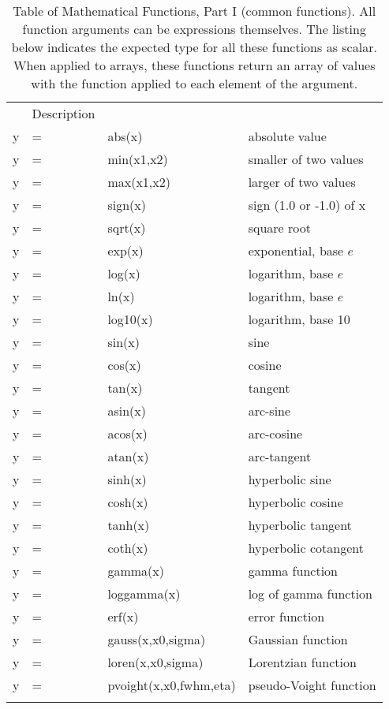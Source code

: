 \begin{table}[t]
{}
 \begin{center}
  \caption[a]{Table of Mathematical Functions, Part I (common functions).
    All function arguments can be expressions themselves.  The listing
    below indicates the expected type for all these functions as scalar.
    When applied to arrays, these functions return an array of values with
    the function applied to each element of the argument.  \smallskip }
  {\label{Table:Operators1}}
  \begin{tabular}{llll}
    \noalign{\smallskip}%
    \multicolumn{3}{l}{Function Prototype} & Description  \\ 
 \noalign{\smallskip}    \hline    \noalign{\smallskip}    
    y   &=&  abs(x)       & absolute value\\
    y   &=&  min(x1,x2)   & smaller of two values\\
    y   &=&  max(x1,x2)   & larger of two values\\
    y   &=&  sign(x)      & sign (1.0 or -1.0) of x \\
    y   &=&  sqrt(x)      & square root\\
    y   &=&  exp(x)       & exponential, base $e$\\
    y   &=&  log(x)       & logarithm, base $e$\\
    y   &=&  ln(x)        & logarithm, base $e$\\
    y   &=&  log10(x)     & logarithm, base 10\\
    y   &=&  sin(x)       & sine\\
    y   &=&  cos(x)       & cosine\\
    y   &=&  tan(x)       & tangent\\
    y   &=&  asin(x)      & arc-sine\\
    y   &=&  acos(x)      & arc-cosine\\
    y   &=&  atan(x)      & arc-tangent\\
    y   &=&  sinh(x)      & hyperbolic sine\\
    y   &=&  cosh(x)      & hyperbolic cosine\\
    y   &=&  tanh(x)      & hyperbolic tangent\\
    y   &=&  coth(x)      & hyperbolic cotangent \\
    y   &=&  gamma(x)     & gamma function \\
    y   &=&  loggamma(x)  & log of gamma function \\
    y   &=&  erf(x)       & error function \\
    y   &=&  gauss(x,x0,sigma)    & Gaussian function \\
    y   &=&  loren(x,x0,sigma)    & Lorentzian function \\
    y   &=&  pvoight(x,x0,fwhm,eta)  & pseudo-Voight  function \\
    \noalign{\smallskip}   \hline
  \end{tabular}
 \end{center}
\end{table} 


